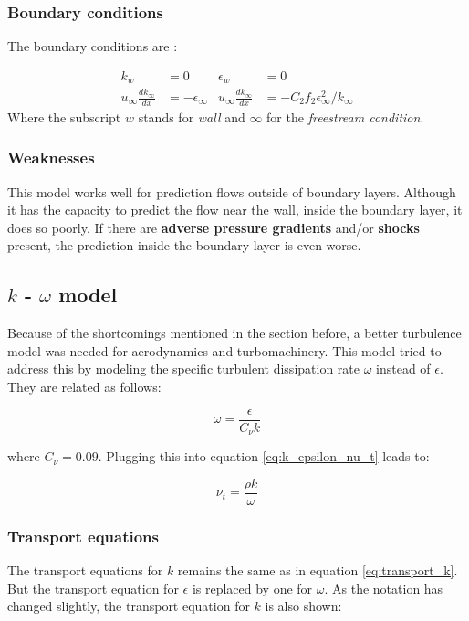 \subsubsection{Boundary conditions}
The boundary conditions are \cite{JONES1972301}:

\begin{align*}
    k_{w}        &= 0       &\epsilon_{w} &= 0 \\
    u_{\infty} \frac{d k_{\infty}}{d x}  &= - \epsilon_{\infty}
    & u_{\infty} \frac{d k_{\infty}}{d x} &= 
    - C_2 f_2 \epsilon_{\infty}^2 / k_{\infty}
\end{align*}
\noindent Where the subscript $w$ stands for \textit{wall} and $\infty$ for the
\textit{freestream condition}.


\subsubsection{Weaknesses}
This model works well for prediction flows outside of boundary layers. Although
it has the capacity to predict the flow near the wall, inside the boundary
layer, it does so poorly. If there are \textbf{adverse pressure gradients}
and/or \textbf{shocks} present, the prediction inside the boundary layer is
even worse. \cite{cfd101_k-epsilon}




\subsection{$k$ - $\omega$ model}
Because of the shortcomings mentioned in the section before, a better
turbulence model was needed for aerodynamics and turbomachinery. This model
tried to address this by modeling the specific turbulent dissipation rate
$\omega$ instead of $\epsilon$. They are related as follows:

\begin{equation}
    \label{eq:omega_epsilon}
    \omega = \frac{\epsilon}{C_{\nu} k}
\end{equation}

\noindent where $C_{\nu} = 0.09$. Plugging this into equation
\ref{eq:k_epsilon_nu_t} leads to:

\begin{equation}
    \nu_t = \frac{\rho k}{\omega}
\end{equation}


\subsubsection{Transport equations}
The transport equations for $k$ remains the same as in equation
\ref{eq:transport_k}. But the transport equation for $\epsilon$ is replaced by
one for $\omega$. As the notation has changed slightly, the transport equation
for $k$ is also shown:

